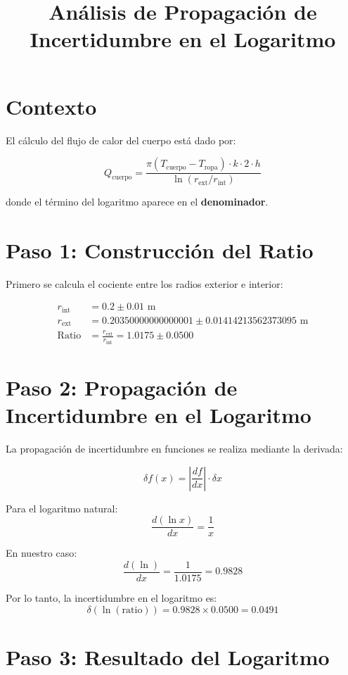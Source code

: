 \documentclass[12pt]{article}
\title{Análisis de Propagación de Incertidumbre en el Logaritmo}
\author{}
\date{}
\begin{document}
\maketitle

\section*{Contexto}

El cálculo del flujo de calor del cuerpo está dado por:

\[
Q_{\text{cuerpo}} = \frac{\pi (T_{\text{cuerpo}} - T_{\text{ropa}}) \cdot k \cdot 2 \cdot h}{\ln(r_{\text{ext}}/r_{\text{int}})}
\]

donde el término del logaritmo aparece en el \textbf{denominador}.

\section*{Paso 1: Construcción del Ratio}

Primero se calcula el cociente entre los radios exterior e interior:

\begin{align*}
r_{\text{int}} &= 0.2 \pm 0.01 \text{ m} \\
r_{\text{ext}} &= 0.20350000000000001 \pm 0.01414213562373095 \text{ m} \\
\text{Ratio} &= \frac{r_{\text{ext}}}{r_{\text{int}}} = 1.0175 \pm 0.0500
\end{align*}

\section*{Paso 2: Propagación de Incertidumbre en el Logaritmo}

La propagación de incertidumbre en funciones se realiza mediante la derivada:

\[
\delta f(x) = \left| \frac{df}{dx} \right| \cdot \delta x
\]

Para el logaritmo natural:
\[
\frac{d(\ln x)}{dx} = \frac{1}{x}
\]

En nuestro caso:
\[
\frac{d(\ln)}{dx} = \frac{1}{1.0175} = 0.9828
\]

Por lo tanto, la incertidumbre en el logaritmo es:
\[
\delta(\ln(\text{ratio})) = 0.9828 \times 0.0500 = 0.0491
\]

\section*{Paso 3: Resultado del Logaritmo}
\end{document}
